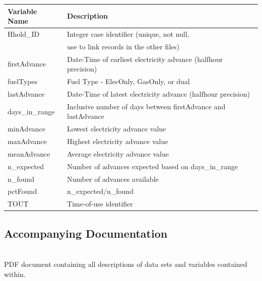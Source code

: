         \begin{left}
            \begin{tabular}{| l | l |}
            \hline
             \textbf{Variable Name} & \textbf{Description} \\
             \hline\hline
             Hhold\_ID & Integer case identifier (unique, not null, \\& use to link records in the other files) \\ 
             \hline
             firstAdvance & Date-Time of earliest electricity advance (halfhour
             precision) \\
             \hline
             fuelTypes & Fuel Type - ElecOnly, GasOnly, or dual \\
             \hline
             lastAdvance & Date-Time of latest electricity advance (halfhour
             precision) \\
             \hline
             days\_in\_range & Inclusive number of days between firstAdvance and
             lastAdvance \\
             \hline
             minAdvance & Lowest electricity advance value \\
             \hline
             maxAdvance & Highest electricity advance value \\
             \hline
             meanAdvance & Average electricity advance value \\
             \hline
             n\_expected & Number of advances expected based on
             days\_in\_range \\
             \hline
             n\_found & Number of advances available\\
             \hline
             pctFound & n\_expected/n\_found\\
             \hline
             TOUT & Time-of-use identifier\\
             \hline
            \end{tabular}
        \end{left}
        
        \subsection{Accompanying Documentation}\\
        PDF document containing all descriptions of data sets and variables contained within.
